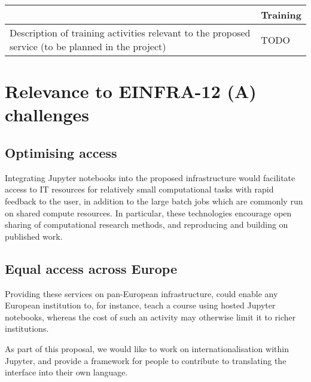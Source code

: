 \begin{tabular}{|p{7cm}|l|}
&Training
\\\hline
Description of training activities relevant to the proposed service (to be planned in the project)&TODO
\\\hline
\end{tabular}

\section{Relevance to EINFRA-12 (A) challenges}


\subsection{Optimising access}

Integrating Jupyter notebooks into the proposed infrastructure would facilitate
access to IT resources for relatively small computational tasks with rapid
feedback to the user, in addition to the large batch jobs which are commonly
run on shared compute resources. In particular, these technologies encourage
open sharing of computational research methods, and reproducing and building on
published work.


\subsection{Equal access across Europe}

Providing these services on pan-European infrastructure, could enable any
European institution to, for instance, teach a course using hosted Jupyter
notebooks, whereas the cost of such an activity may otherwise limit it to richer
institutions.

As part of this proposal, we would like to work on internationalisation within
Jupyter, and provide a framework for people to contribute to translating the
interface into their own language.


